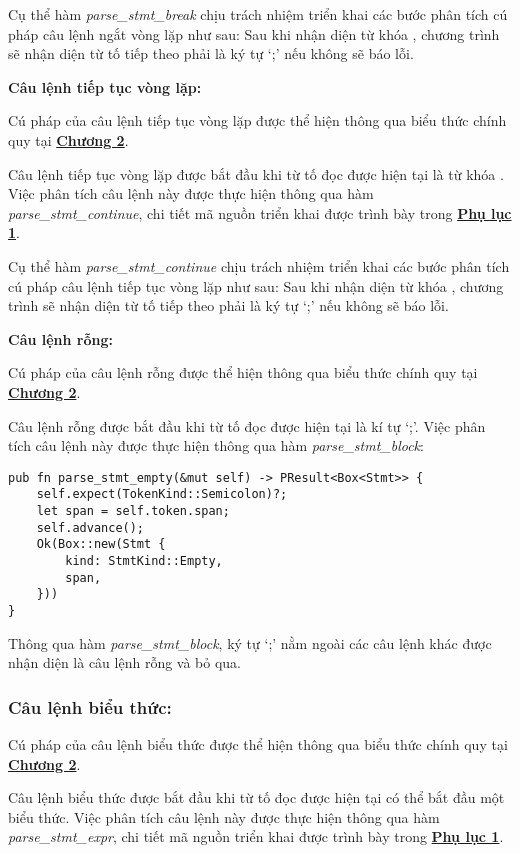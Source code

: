 Cụ thể hàm \textit{parse\_stmt\_break} chịu trách nhiệm triển khai các bước phân tích cú pháp câu lệnh ngắt vòng lặp như sau: Sau khi nhận diện từ khóa , chương trình sẽ nhận diện từ tố tiếp theo phải là ký tự `;' nếu không sẽ báo lỗi.


\textbf{Câu lệnh tiếp tục vòng lặp:}

Cú pháp của câu lệnh tiếp tục vòng lặp được thể hiện thông qua biểu thức chính quy tại \hyperref[ch2:block_stmt]{\bf Chương 2}.

Câu lệnh tiếp tục vòng lặp được bắt đầu khi từ tố đọc được hiện tại là từ khóa . Việc phân tích câu lệnh này được thực hiện thông qua hàm \\\textit{parse\_stmt\_continue}, chi tiết mã nguồn triển khai được trình bày trong \hyperref[ap1:stmtskip]{\bf Phụ lục 1}. %

Cụ thể hàm \textit{parse\_stmt\_continue} chịu trách nhiệm triển khai các bước phân tích cú pháp câu lệnh tiếp tục vòng lặp như sau:
Sau khi nhận diện từ khóa , chương trình sẽ nhận diện từ tố tiếp theo phải là ký tự `;' nếu không sẽ báo lỗi.

\textbf{Câu lệnh rỗng:}

Cú pháp của câu lệnh rỗng được thể hiện thông qua biểu thức chính quy tại \hyperref[ch2:block_stmt]{\bf Chương 2}.

Câu lệnh rỗng được bắt đầu khi từ tố đọc được hiện tại là kí tự `;'. Việc phân tích câu lệnh này được thực hiện thông qua hàm \textit{parse\_stmt\_block}:

\begin{lstlisting}
pub fn parse_stmt_empty(&mut self) -> PResult<Box<Stmt>> {
    self.expect(TokenKind::Semicolon)?;
    let span = self.token.span;
    self.advance();
    Ok(Box::new(Stmt {
        kind: StmtKind::Empty,
        span,
    }))
}
\end{lstlisting}

Thông qua hàm \textit{parse\_stmt\_block}, ký tự `;' nằm ngoài các câu lệnh khác được nhận diện là câu lệnh rỗng và bỏ qua.

\subsubsection{Câu lệnh biểu thức:} 
Cú pháp của câu lệnh biểu thức được thể hiện thông qua biểu thức chính quy tại \hyperref[ch2:expr_stmt]{\bf Chương 2}.

Câu lệnh biểu thức được bắt đầu khi từ tố đọc được hiện tại có thể bắt đầu một biểu thức. Việc phân tích câu lệnh này được thực hiện thông qua hàm \textit{parse\_stmt\_expr}, chi tiết mã nguồn triển khai được trình bày trong \hyperref[ap1:stmtexpr]{\bf Phụ lục 1}. %


